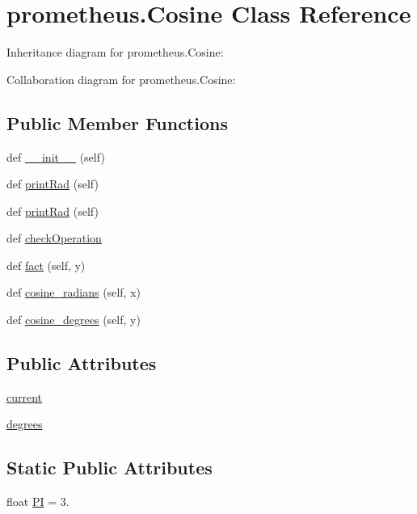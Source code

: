 \hypertarget{classprometheus_1_1_cosine}{}\section{prometheus.\+Cosine Class Reference}
\label{classprometheus_1_1_cosine}


Inheritance diagram for prometheus.\+Cosine\+:


Collaboration diagram for prometheus.\+Cosine\+:
\subsection*{Public Member Functions}
\begin{DoxyCompactItemize}
\item 
def \hyperlink{classprometheus_1_1_cosine_ab4a54b3a7d9e4b8701d2cf38dd3f2a45}{\+\_\+\+\_\+init\+\_\+\+\_\+} (self)
\item 
def \hyperlink{classprometheus_1_1_cosine_a9b3148aa54fb08fe679970951bc33ffb}{print\+Rad} (self)
\item 
def \hyperlink{classprometheus_1_1_cosine_a9b3148aa54fb08fe679970951bc33ffb}{print\+Rad} (self)
\item 
def \hyperlink{classprometheus_1_1_cosine_af6bbca909c4253a88d0cd54eacec2d89}{check\+Operation}
\item 
def \hyperlink{classprometheus_1_1_cosine_a65c3b1162f86debd5ccb153d65f880a8}{fact} (self, y)
\item 
def \hyperlink{classprometheus_1_1_cosine_a7e9ec76b84cbcf6a61689286056d466f}{cosine\+\_\+radians} (self, x)
\item 
def \hyperlink{classprometheus_1_1_cosine_abc34ebfcb2d84a9e994844fa42a64ad3}{cosine\+\_\+degrees} (self, y)
\end{DoxyCompactItemize}
\subsection*{Public Attributes}
\begin{DoxyCompactItemize}
\item 
\hyperlink{classprometheus_1_1_cosine_a5b9b3d0f2799ba6ac1ad554e28715a48}{current}
\item 
\hyperlink{classprometheus_1_1_cosine_adf915076bca45b2b93ea7792742c0422}{degrees}
\end{DoxyCompactItemize}
\subsection*{Static Public Attributes}
\begin{DoxyCompactItemize}
\item 
float \hyperlink{classprometheus_1_1_cosine_a61a8ff3f53cb6132397f93bf73f89055}{P\+I} = 3.
\end{DoxyCompactItemize}


